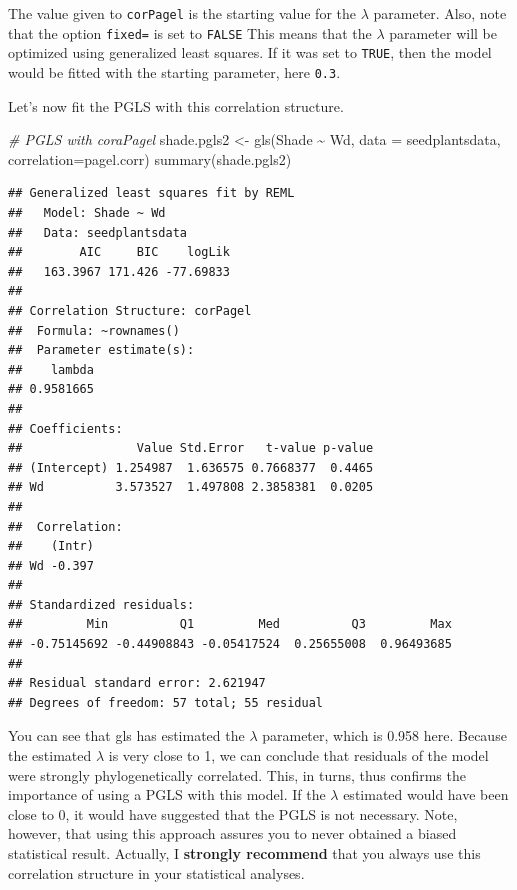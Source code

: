 \documentclass[
]{book}
\newenvironment{Shaded}{\begin{snugshade}}{\end{snugshade}}
\newcommand{\AttributeTok}[1]{\textcolor[rgb]{0.77,0.63,0.00}{#1}}
\newcommand{\CommentTok}[1]{\textcolor[rgb]{0.56,0.35,0.01}{\textit{#1}}}
\newcommand{\FunctionTok}[1]{\textcolor[rgb]{0.00,0.00,0.00}{#1}}
\newcommand{\NormalTok}[1]{#1}
\newcommand{\OtherTok}[1]{\textcolor[rgb]{0.56,0.35,0.01}{#1}}
\newcommand{\SpecialCharTok}[1]{\textcolor[rgb]{0.00,0.00,0.00}{#1}}
\begin{document}
The value given to \texttt{corPagel} is the starting value for the \(\lambda\) parameter. Also, note that the option \texttt{fixed=} is set to \texttt{FALSE} This means that the \(\lambda\) parameter will be optimized using generalized least squares. If it was set to \texttt{TRUE}, then the model would be fitted with the starting parameter, here \texttt{0.3}.

Let's now fit the PGLS with this correlation structure.

\begin{Shaded}
\begin{Highlighting}[]
\CommentTok{\# PGLS with coraPagel}
\NormalTok{shade.pgls2 }\OtherTok{\textless{}{-}} \FunctionTok{gls}\NormalTok{(Shade }\SpecialCharTok{\textasciitilde{}}\NormalTok{ Wd, }\AttributeTok{data =}\NormalTok{ seedplantsdata, }\AttributeTok{correlation=}\NormalTok{pagel.corr)}
\FunctionTok{summary}\NormalTok{(shade.pgls2)}
\end{Highlighting}
\end{Shaded}

\begin{verbatim}
## Generalized least squares fit by REML
##   Model: Shade ~ Wd 
##   Data: seedplantsdata 
##        AIC     BIC    logLik
##   163.3967 171.426 -77.69833
## 
## Correlation Structure: corPagel
##  Formula: ~rownames() 
##  Parameter estimate(s):
##    lambda 
## 0.9581665 
## 
## Coefficients:
##                Value Std.Error   t-value p-value
## (Intercept) 1.254987  1.636575 0.7668377  0.4465
## Wd          3.573527  1.497808 2.3858381  0.0205
## 
##  Correlation: 
##    (Intr)
## Wd -0.397
## 
## Standardized residuals:
##         Min          Q1         Med          Q3         Max 
## -0.75145692 -0.44908843 -0.05417524  0.25655008  0.96493685 
## 
## Residual standard error: 2.621947 
## Degrees of freedom: 57 total; 55 residual
\end{verbatim}

You can see that gls has estimated the \(\lambda\) parameter, which is 0.958 here. Because the estimated \(\lambda\) is very close to 1, we can conclude that residuals of the model were strongly phylogenetically correlated. This, in turns, thus confirms the importance of using a PGLS with this model. If the \(\lambda\) estimated would have been close to 0, it would have suggested that the PGLS is not necessary. Note, however, that using this approach assures you to never obtained a biased statistical result. Actually, I \textbf{strongly recommend} that you always use this correlation structure in your statistical analyses.
\end{document}
